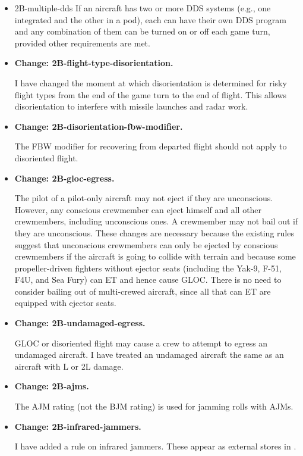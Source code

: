 \documentclass[10pt]{report}
\newcommand{\itemtag}[1]{\item \textbf{Change: #1.}\par}
\begin{document}
\begin{itemize}

    
    \item{2B-multiple-dds} If an aircraft has two or more DDS systems (e.g., one integrated and the other in a pod), each can have their own DDS program and any combination of them can be turned on or off each game turn, provided other requirements are met.

    \itemtag{2B-flight-type-disorientation} I have changed the moment at which disorientation is determined for risky flight types from the end of the game turn to the end of flight. This allows disorientation to interfere with missile launches and radar work.
    
    \itemtag{2B-disorientation-fbw-modifier} The FBW modifier for recovering from departed flight should not apply to disoriented flight.

    \itemtag{2B-gloc-egress} The pilot of a pilot-only aircraft may not eject if they are unconscious. However, any conscious crewmember can eject himself and all other crewmembers, including unconscious ones. A crewmember may not bail out if they are unconscious. These changes are necessary because the existing rules suggest that unconscious crewmembers can only be ejected by conscious crewmembers if the aircraft is going to collide with terrain and because some propeller-driven fighters without ejector seats (including the Yak-9, F-51, F4U, and Sea Fury) can ET and hence cause GLOC. There is no need to consider bailing out of multi-crewed aircraft, since all that can ET are equipped with ejector seats.

    \itemtag{2B-undamaged-egress} GLOC or disoriented flight may cause a crew to attempt to egress an undamaged aircraft. I have treated an undamaged aircraft the same as an aircraft with L or 2L damage.
    
    \itemtag{2B-ajms} The AJM rating (not the BJM rating) is used for jamming rolls with AJMs.
    
    \itemtag{2B-infrared-jammers} I have added a rule on infrared jammers. These appear as external stores in {\TSOH}.
    

\end{itemize}
\end{document}

